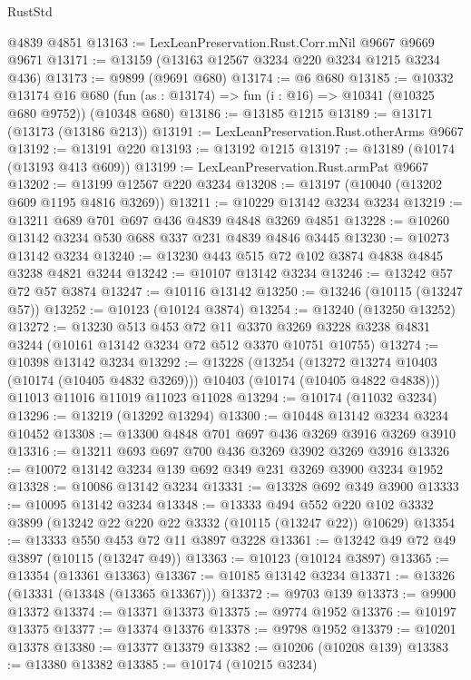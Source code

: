 \begin{lexlean}{RustStd}
\begin{coremodule}
    @4839
    @4851
@13163 := LexLeanPreservation.Rust.Corr.mNil @9667 @9669 @9671
@13171 := @13159 (@13163 @12567 @3234 @220 @3234 @1215 @3234 @436)
@13173 := @9899 (@9691 @680)
@13174 := @6 @680
@13185 := @10332
    @13174
    @16
    @680
    (fun (as : @13174) => fun (i : @16) => @10341 (@10325 @680 @9752))
    (@10348 @680)
@13186 := @13185 @1215
@13189 := @13171 (@13173 (@13186 @213))
@13191 := LexLeanPreservation.Rust.otherArms @9667
@13192 := @13191 @220
@13193 := @13192 @1215
@13197 := @13189 (@10174 (@13193 @413 @609))
@13199 := LexLeanPreservation.Rust.armPat @9667
@13202 := @13199 @12567 @220 @3234
@13208 := @13197 (@10040 (@13202 @609 @1195 @4816 @3269))
@13211 := @10229 @13142 @3234 @3234
@13219 := @13211 @689 @701 @697 @436 @4839 @4848 @3269 @4851
@13228 := @10260 @13142 @3234 @530 @688 @337 @231 @4839 @4846 @3445
@13230 := @10273 @13142 @3234
@13240 := @13230 @443 @515 @72 @102 @3874 @4838 @4845 @3238 @4821 @3244
@13242 := @10107 @13142 @3234
@13246 := @13242 @57 @72 @57 @3874
@13247 := @10116 @13142
@13250 := @13246 (@10115 (@13247 @57))
@13252 := @10123 (@10124 @3874)
@13254 := @13240 (@13250 @13252)
@13272 := @13230
    @513
    @453
    @72
    @11
    @3370
    @3269
    @3228
    @3238
    @4831
    @3244
    (@10161 @13142 @3234 @72 @512 @3370 @10751 @10755)
@13274 := @10398 @13142 @3234
@13292 := @13228
    (@13254
      (@13272 @13274 @10403 (@10174 (@10405 @4832 @3269)))
      @10403
      (@10174 (@10405 @4822 @4838)))
    @11013
    @11016
    @11019
    @11023
    @11028
@13294 := @10174 (@11032 @3234)
@13296 := @13219 (@13292 @13294)
@13300 := @10448 @13142 @3234 @3234 @10452
@13308 := @13300 @4848 @701 @697 @436 @3269 @3916 @3269 @3910
@13316 := @13211 @693 @697 @700 @436 @3269 @3902 @3269 @3916
@13326 := @10072 @13142 @3234 @139 @692 @349 @231 @3269 @3900 @3234 @1952
@13328 := @10086 @13142 @3234
@13331 := @13328 @692 @349 @3900
@13333 := @10095 @13142 @3234
@13348 := @13333
    @494
    @552
    @220
    @102
    @3332
    @3899
    (@13242 @22 @220 @22 @3332 (@10115 (@13247 @22)) @10629)
@13354 := @13333 @550 @453 @72 @11 @3897 @3228
@13361 := @13242 @49 @72 @49 @3897 (@10115 (@13247 @49))
@13363 := @10123 (@10124 @3897)
@13365 := @13354 (@13361 @13363)
@13367 := @10185 @13142 @3234
@13371 := @13326 (@13331 (@13348 (@13365 @13367)))
@13372 := @9703 @139
@13373 := @9900 @13372
@13374 := @13371 @13373
@13375 := @9774 @1952
@13376 := @10197 @13375
@13377 := @13374 @13376
@13378 := @9798 @1952
@13379 := @10201 @13378
@13380 := @13377 @13379
@13382 := @10206 (@10208 @139)
@13383 := @13380 @13382
@13385 := @10174 (@10215 @3234)

\end{coremodule}
\end{lexlean}
